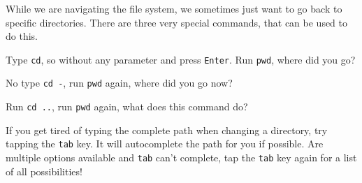\begin{challenge}
    \begin{task}
    While we are navigating the file system, we sometimes just want to go back to specific directories.
    There are three very special commands, that can be used to do this.
        \begin{questions}
            \item Type \texttt{cd}, so without any parameter and press \texttt{Enter}. Run \texttt{pwd}, where did you go?
            \item No type \texttt{cd -}, run \texttt{pwd} again, where did you go now?
            \item Run \texttt{cd ..}, run \texttt{pwd} again, what does this command do?
        \end{questions}
    \end{task}
    \begin{advice}
        If you get tired of typing the complete path when changing a directory, try tapping the \texttt{tab} key.
        It will autocomplete the path for you if possible.
        Are multiple options available and \texttt{tab} can't complete, tap the \texttt{tab} key again for a list of all possibilities!
    \end{advice}
\end{challenge}
    
